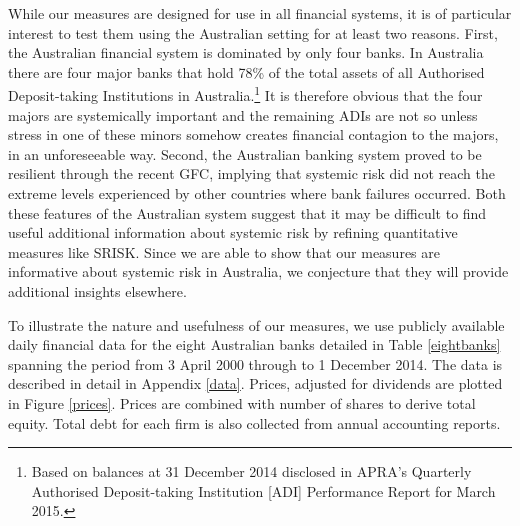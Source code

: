 \documentclass[12pt]{article}
\newcommand{\fref}[1]{Figure \ref{#1}}
\newcommand{\tref}[1]{Table \ref{#1}}
\newcommand{\aref}[1]{Appendix \ref{#1}}
\begin{document}

While our measures are designed for use in all financial systems, it is of particular interest to test them using the Australian setting for at least two reasons. First, the Australian financial system is dominated by only four banks. In Australia there are four major banks that hold 78\% of the total assets of all Authorised Deposit-taking Institutions in  Australia.\footnote{Based on balances at 31 December 2014 disclosed in APRA's Quarterly Authorised Deposit-taking Institution [ADI] Performance Report for March 2015.} It is therefore obvious that the four majors are systemically important and the remaining ADIs are not so unless stress in one of these minors somehow creates financial contagion to the majors, in an unforeseeable way. Second, the Australian banking system proved to be resilient through the recent GFC, implying that systemic risk did not reach the extreme levels experienced by other countries where bank failures occurred. Both these features of the Australian system suggest that it may be difficult to find useful additional information about systemic risk by refining quantitative measures like SRISK. Since we are able to show that our measures are informative about systemic risk in Australia, we conjecture that they will provide additional insights elsewhere.  

To illustrate the nature and usefulness of our measures, we use publicly available daily financial data for the eight Australian banks detailed in \tref{eightbanks} spanning the period from  3 April 2000 through to 1 December 2014.  The data is described in detail in \aref{data}.  Prices, adjusted for dividends are plotted in \fref{prices}.  Prices are combined with number of shares to derive total equity. Total debt for each firm is also collected from annual accounting reports. %
\end{document}
